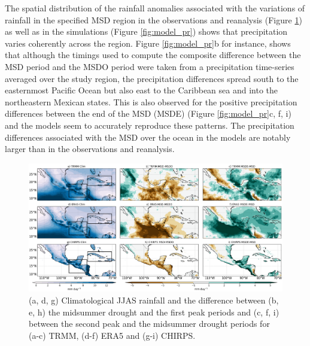 The spatial distribution of the rainfall anomalies associated with the variations of rainfall in the specified MSD region in the observations and reanalysis (Figure \ref{fig:eof2}) as well as in the simulations (Figure \ref{fig:model_pr}) shows that precipitation varies coherently across the region. 
Figure \ref{fig:model_pr}b for instance, shows that although the timings used to compute the composite difference between the MSD period and the MSDO period were taken from a precipitation time-series averaged over the study region, the precipitation differences spread south to the easternmost Pacific Ocean but also east to the Caribbean sea and into the northeastern Mexican states. This is also observed for the positive precipitation differences between the end of the MSD (MSDE) (Figure \ref{fig:model_pr}c, f, i) and the models seem to accurately reproduce these patterns. The precipitation differences associated with the MSD over the ocean in the models are notably larger than in the observations and reanalysis.  
 
 
  \begin{figure}[t!]
\includegraphics[width=\linewidth]{figures/fig2obs_prdiff_2.png}
\caption{ (a, d, g) Climatological JJAS rainfall and the difference between  (b, e, h)  the midsummer drought and the first peak periods and (c, f, i)  between the second peak and the midsummer drought periods for (a-c) TRMM, (d-f) ERA5 and (g-i) CHIRPS.}
\label{fig:eof2}
\end{figure} 
 
